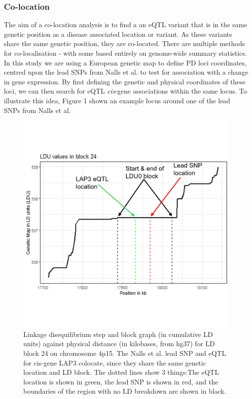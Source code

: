 \documentclass{article}
\begin{document}
\subsubsection{Co-location}
\label{subsubsec:co-location}
The aim of a co-location analysis is to find a an eQTL variant that is in the same genetic position as a disease associated location or variant\cite{Cano-Gamez2020FromDiseases}. As these variants share the same genetic position, they are co-located. There are multiple methods for co-localisation - with some based entirely on genome-wide summary statistics. In this study we are using a European genetic map\cite{Maniatis2004PositionalDisequilibrium.} to define PD loci coordinates, centred upon the lead SNPs from Nalls et al.\cite{Nalls2019IdentificationStudies} to test for association with a change in gene expression. By first defining the genetic and physical coordinates of these loci, we can then search for eQTL \textit{cis}-gene associations within the same locus. To illustrate this idea, Figure 1 shown an example locus around one of the lead SNPs from Nalls et al.\cite{Nalls2019IdentificationStudies}
\begin{figure}[!h]
    \centering
    \includegraphics[width=1\linewidth]{Thesis/thesis images/exampleblock.png}
    \caption{Linkage disequilibrium step and block graph (in cumulative LD units) against physical distance (in kilobases, from hg37) for LD block 24 on chromosome 4p15. The Nalls et al. lead SNP and eQTL for cis-gene LAP3 colocate, since they share the same genetic location and LD block. The dotted lines show 3 things:The eQTL location is shown in green, the lead SNP is shown in red, and the boundaries of the region with no LD breakdown are shown in black.}
    \label{fig:enter-label}
\end{figure}
\end{document}
